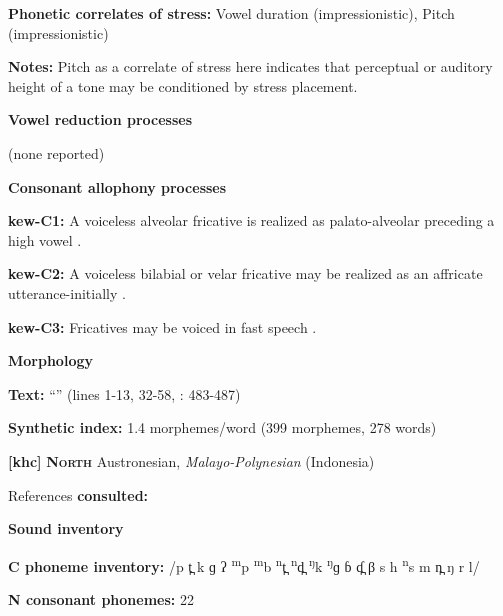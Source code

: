 \textbf{Phonetic correlates of stress:} Vowel duration (impressionistic), Pitch (impressionistic)



\textbf{Notes:} Pitch as a correlate of stress here indicates that perceptual or auditory height of a tone may be conditioned by stress placement.



\textbf{Vowel reduction processes}



(none reported)



\textbf{Consonant allophony processes}



\textbf{kew-C1:} A voiceless alveolar fricative is realized as palato-alveolar preceding a high vowel \citep[24]{Franklin1971}.



\textbf{kew-C2:} A voiceless bilabial or velar fricative may be realized as an affricate utterance-initially \citep[24]{Franklin1971}.



\textbf{kew-C3:} Fricatives may be voiced in fast speech \citep[24]{Franklin1971}.



\textbf{Morphology}



\textbf{Text:} “” (lines 1-13, 32-58, \citealt{FranklinFranklin1978}: 483-487)



\textbf{Synthetic index:} 1.4 morphemes/word (399 morphemes, 278 words)



\textbf{[khc]}   \textbf{\textsc{ North}}  Austronesian, \textit{Malayo-Polynesian} (Indonesia)



References \textbf{consulted:} \citet{Donohue1999}



\textbf{Sound inventory}



\textbf{C phoneme inventory:} /p t̪ k ɡ ʔ \textsuperscript{m}p \textsuperscript{m}b \textsuperscript{n}t̪ \textsuperscript{n}d̪ \textsuperscript{ŋ}k \textsuperscript{ŋ}ɡ ɓ ɗ̪ β s h \textsuperscript{n}s m n̪ ŋ r l/



\textbf{N consonant phonemes:} 22



